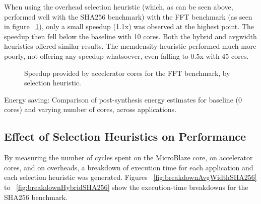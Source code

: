 \documentclass{UoYCSproject}
\begin{document}
When using the overhead selection heuristic (which, as can be seen above, performed well with the SHA256 benchmark)
with the FFT benchmark (as seen in figure ~\ref{fig:speedupFFT}), only a small speedup (1.1x) was observed at the highest
point. The speedup then fell below the baseline with 10 cores. Both the hybrid and avgwidth heuristics offered similar results.
The memdensity heuristic performed much more poorly, not offering any speedup whatsoever, even falling to 0.5x with 45 cores.

\begin{figure}[H]
\caption{Speedup provided by accelerator cores for the FFT benchmark, by selection heuristic.}
\label{fig:speedupFFT}
\end{figure}

Energy saving: Comparison of post-synthesis energy estimates for baseline (0 cores) and varying number of cores, across
applications.

\subsection{Effect of Selection Heuristics on Performance}

By measuring the number of cycles spent on the MicroBlaze core, on accelerator cores, and on overheads,
a breakdown of execution time for each application and each selection heuristic was generated.
Figures ~\ref{fig:breakdownAvgWidthSHA256} to ~\ref{fig:breakdownHybridSHA256} show the execution-time breakdowns
for the SHA256 benchmark.
\end{document}
